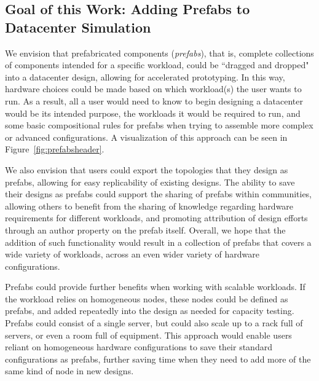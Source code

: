 \documentclass[11pt]{article}
\begin{document}
	\subsection{Goal of this Work: Adding Prefabs to Datacenter Simulation}
		We envision that prefabricated components (\textit{prefabs}), that is, complete collections of components intended for a specific workload, could be ``dragged and dropped" into a datacenter design, allowing for accelerated prototyping.
		In this way, hardware choices could be made based on which workload(s) the user wants to run.
		As a result, all a user would need to know to begin designing a datacenter would be its intended purpose, the workloads it would be required to run, and some basic compositional rules for prefabs when trying to assemble more complex or advanced configurations.
		A visualization of this approach can be seen in Figure~\ref{fig:prefabsheader}.

		We also envision that users could export the topologies that they design as prefabs, allowing for easy replicability of existing designs.
		The ability to save their designs as prefabs could support the sharing of prefabs within communities, allowing others to benefit from the sharing of knowledge regarding hardware requirements for different workloads, and promoting attribution of design efforts through an author property on the prefab itself.
		Overall, we hope that the addition of such functionality would result in a collection of prefabs that covers a wide variety of workloads, across an even wider variety of hardware configurations.

		Prefabs could provide further benefits when working with scalable workloads.
		If the workload relies on homogeneous nodes, these nodes could be defined as prefabs, and added repeatedly into the design as needed for capacity testing.
		Prefabs could consist of a single server, but could also scale up to a rack full of servers, or even a room full of equipment.
		This approach would enable users reliant on homogeneous hardware configurations to save their standard configurations as prefabs, further saving time when they need to add more of the same kind of node in new designs.
	
\end{document}
